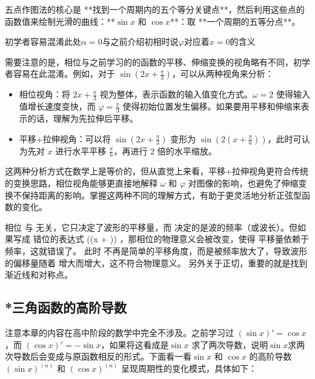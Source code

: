 五点作图法的核心是 **找到一个周期内的五个等分关键点**，然后利用这些点的函数值来绘制光滑的曲线：**$\sin x$ 和 $\cos x$**：取 **一个周期的五等分点**。

初学者容易混淆此处$\alpha=0$与之前介绍初相时说$\varphi$对应着$x=0$的含义


需要注意的是，相位与之前学习的的函数的平移、伸缩变换的视角略有不同，初学者容易在此混淆。例如，对于 $\displaystyle\sin(2x + \frac{\pi}{3})$，可以从两种视角来分析：
\begin{itemize}
\item 相位视角：将 $\displaystyle2x + \frac{\pi}{3}$ 视为整体，表示函数的输入值变化方式。$\omega = 2$ 使得输入值增长速度变快，而 $\displaystyle\varphi = \frac{\pi}{3}$ 使得初始位置发生偏移。如果要用平移和伸缩来表示的话，理解为先拉伸后平移。
\item 平移+拉伸视角：可以将 $\displaystyle\sin(2x + \frac{\pi}{3})$ 变形为 $\displaystyle\sin\left(2(x + \frac{\pi}{6})\right)$，此时可认为先对 $x$ 进行水平平移 $\displaystyle\frac{\pi}{6}$，再进行 $2$ 倍的水平缩放。
\end{itemize}

这两种分析方式在数学上是等价的，但从直觉上来看，平移+拉伸视角更符合传统的变换思路，相位视角能够更直接地解释 $\omega$ 和 $\varphi$ 对图像的影响，也避免了伸缩变换不保持距离的影响。掌握这两种不同的理解方式，有助于更灵活地分析正弦型函数的变化。

相位  \phi  与  \omega  无关，它只决定了波形的平移量，而  \omega  决定的是波的频率（或波长）。但如果写成 错位的表达式  \sin(\omega(x + \phi)) ，那相位的物理意义会被改变，使得 平移量依赖于频率，这就错误了。
此时  \phi  不再是简单的平移角度，而是被频率放大了，导致波形的偏移量随着  \omega  增大而增大，这不符合物理意义。
另外关于正切，重要的就是找到渐近线和对称点。



\subsection{*三角函数的高阶导数}


注意本章的内容在高中阶段的数学中完全不涉及。之前学习过 $(\sin x)' = \cos x$，而 $(\cos x)' = -\sin x$，如果将这看成是$\sin x$ 求了两次导数，说明$\sin x$求两次导数后会变成与原函数相反的形式。下面看一看$\sin x$ 和 $\cos x$ 的高阶导数$(\sin x)^{(n)}$ 和 $(\cos x)^{(n)}$ 呈现周期性的变化模式，具体如下：

